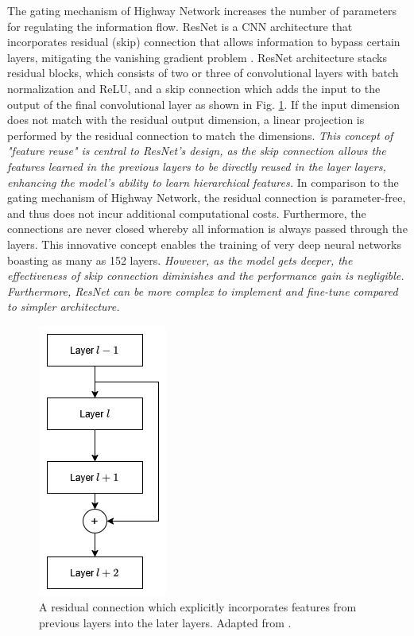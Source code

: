 \documentclass[preprint,12pt]{elsarticle}
\begin{document}
The gating mechanism of Highway Network increases the number of parameters for regulating the information flow. ResNet is a CNN architecture that incorporates residual (skip) connection that allows information to bypass certain layers, mitigating the vanishing gradient problem \citep{he_deep_2015}. ResNet architecture stacks residual blocks, which consists of two or three of convolutional layers with batch normalization and ReLU, and a skip connection which adds the input to the output of the final convolutional layer as shown in Fig. \ref{fig_deep_sv_learning_cnn_resnet}. If the input dimension does not match with the residual output dimension, a linear projection is performed by the residual connection to match the dimensions. \emph{This concept of "feature reuse" is central to ResNet's design, as the skip connection allows the features learned in the previous layers to be directly reused in the layer layers, enhancing the model's ability to learn hierarchical features.} In comparison to the gating mechanism of Highway Network, the residual connection is parameter-free, and thus does not incur additional computational costs. Furthermore, the connections are never closed whereby all information is always passed through the layers. This innovative concept enables the training of very deep neural networks boasting as many as 152 layers. \emph{However, as the model gets deeper, the effectiveness of skip connection diminishes and the performance gain is negligible. Furthermore, ResNet can be more complex to implement and fine-tune compared to simpler architecture.}

\begin{figure}[h!]
    \centering
    \includegraphics[scale=0.5]{fig_deep_sv_learning_cnn_resnet.png}
    \caption{A residual connection which explicitly incorporates features from previous layers into the later layers. Adapted from \citep{he_deep_2015}.}
    \label{fig_deep_sv_learning_cnn_resnet}
\end{figure}
\end{document}
